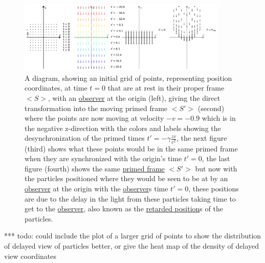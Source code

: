 \begin{figure}[H]
	\centering
	\includegraphics[width=10cm]{images/pdf/coordinate_transforms_2.pdf}

	\caption{A diagram, showing an initial grid of points, representing position coordinates, at time $t=0$ that are at rest in their proper frame ${<\!\!S\!>}$, with an \protect\hyperlink{def-observer}{observer} at the origin (left), giving the direct transformation into the moving primed frame ${<\!\!S{'}\!\!>}$ (second) where the points are now moving at velocity $-v=-0.9$ which is in the negative z-direction with the colors and labels showing the desynchronization of the primed times $t{'}=- {\gamma} \frac{zv}{c^2}$, the next figure (third) shows what these points would be in the same primed frame when they are synchronized with the origin's time $t{'}=0$, the last figure (fourth) shows the same \protect\hyperlink{def-Primed-Frame}{primed frame} ${<\!\!S{'}\!\!>}$ but now with the particles positioned where they would be seen to be at by an \protect\hyperlink{def-observer}{observer} at the origin with the \protect\hyperlink{def-observer}{observer}s time $t{'}=0$, these positions are due to the delay in the light from these particles taking time to get to the \protect\hyperlink{def-observer}{observer}, also known as the \protect\hyperlink{def-retarded-position}{retarded position}s of the particles.}
	\label{fig: full coordinate transform}
\end{figure}

*** todo: could include the plot of a larger grid of points to show the distribution of delayed view of particles better, or give the heat map of the density of delayed view coordinates



